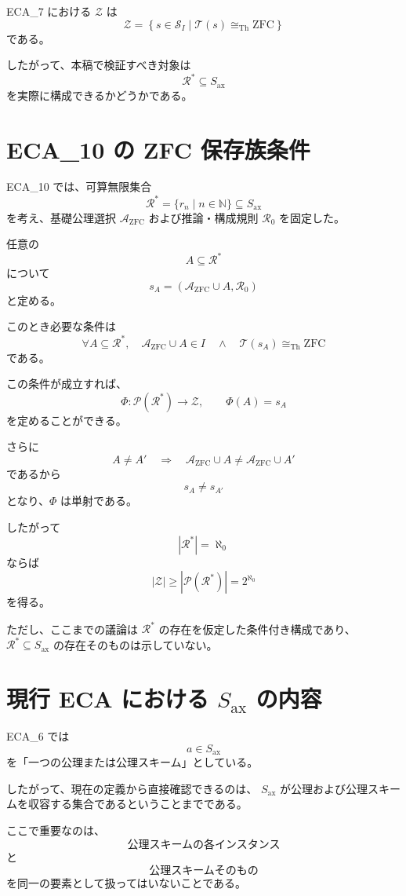 \documentclass[a4paper,11pt]{jsarticle}
\newcommand{\Solver}{\mathcal{S}}
\newcommand{\Ax}{S_{\mathrm{ax}}}
\newcommand{\Sel}{I}
\begin{document}
ECA_7 における $\mathcal{Z}$ は
\[
\boxed{
\mathcal{Z}
=
\left\{
s\in\Solver_{\Sel}
\mid
\mathcal{T}(s)\cong_{\mathrm{Th}}\mathrm{ZFC}
\right\}
}
\]
である。

したがって、本稿で検証すべき対象は
\[
\mathcal{R}^{*}\subseteq\Ax
\]
を実際に構成できるかどうかである。

\section{ECA_10 の ZFC 保存族条件}

ECA_10 では、可算無限集合
\[
\mathcal{R}^{*}=\{r_n\mid n\in\mathbb{N}\}\subseteq\Ax
\]
を考え、基礎公理選択 $\mathcal{A}_{\mathrm{ZFC}}$ および推論・構成規則
$\mathcal{R}_0$ を固定した。

任意の
\[
A\subseteq\mathcal{R}^{*}
\]
について
\[
s_A=
\left(
\mathcal{A}_{\mathrm{ZFC}}\cup A,\mathcal{R}_0
\right)
\]
と定める。

このとき必要な条件は
\[
\boxed{
\forall A\subseteq\mathcal{R}^{*},
\quad
\mathcal{A}_{\mathrm{ZFC}}\cup A\in\Sel
\quad\land\quad
\mathcal{T}(s_A)\cong_{\mathrm{Th}}\mathrm{ZFC}
}
\]
である。

この条件が成立すれば、
\[
\Phi:\mathcal{P}(\mathcal{R}^{*})\longrightarrow\mathcal{Z},
\qquad
\Phi(A)=s_A
\]
を定めることができる。

さらに
\[
A\neq A'
\quad\Longrightarrow\quad
\mathcal{A}_{\mathrm{ZFC}}\cup A
\neq
\mathcal{A}_{\mathrm{ZFC}}\cup A'
\]
であるから
\[
s_A\neq s_{A'}
\]
となり、$\Phi$ は単射である。

したがって
\[
|\mathcal{R}^{*}|=\aleph_0
\]
ならば
\[
|\mathcal{Z}|
\ge
|\mathcal{P}(\mathcal{R}^{*})|
=
2^{\aleph_0}
\]
を得る。

ただし、ここまでの議論は $\mathcal{R}^{*}$ の存在を仮定した条件付き構成であり、
$\mathcal{R}^{*}\subseteq\Ax$ の存在そのものは示していない。

\section{現行 ECA における $\Ax$ の内容}

ECA_6 では
\[
a\in\Ax
\]
を「一つの公理または公理スキーム」としている。

したがって、現在の定義から直接確認できるのは、
$\Ax$ が公理および公理スキームを収容する集合であるということまでである。

ここで重要なのは、
\[
\text{公理スキームの各インスタンス}
\]
と
\[
\text{公理スキームそのもの}
\]
を同一の要素として扱ってはいないことである。
\end{document}

